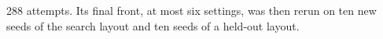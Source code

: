 288 attempts. Its final front, at most six settings, was then rerun on ten new seeds of
the search layout and ten seeds of a held-out layout.

